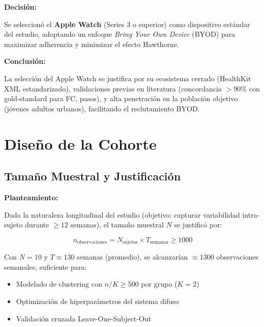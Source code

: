 \documentclass[12pt,letterpaper,twoside]{report}
\begin{document}
\begin{decisionbox}
\textbf{Decisión:}

Se seleccionó el \textbf{Apple Watch} (Series 3 o superior) como dispositivo estándar del estudio, adoptando un enfoque \textit{Bring Your Own Device} (BYOD) para maximizar adherencia y minimizar el efecto Hawthorne.
\end{decisionbox}

\begin{conclusionbox}
\textbf{Conclusión:}

La selección del Apple Watch se justifica por su ecosistema cerrado (HealthKit XML estandarizado), validaciones previas en literatura (concordancia $> 90\%$ con gold-standard para FC, pasos), y alta penetración en la población objetivo (jóvenes adultos urbanos), facilitando el reclutamiento BYOD.
\end{conclusionbox}

\section{Diseño de la Cohorte}

\subsection{Tamaño Muestral y Justificación}

\begin{hipotesisbox}
\textbf{Planteamiento:}

Dada la naturaleza longitudinal del estudio (objetivo: capturar variabilidad intra-sujeto durante $\geq 12$ semanas), el tamaño muestral $N$ se justificó por:

\begin{equation}
n_{\text{observaciones}} = N_{\text{sujetos}} \times T_{\text{semanas}} \geq 1000
\end{equation}

Con $N=10$ y $T \approx 130$ semanas (promedio), se alcanzarían $\approx 1300$ observaciones semanales, suficiente para:
\begin{itemize}[noitemsep]
    \item Modelado de clustering con $n/K \geq 500$ por grupo ($K=2$)
    \item Optimización de hiperparámetros del sistema difuso
    \item Validación cruzada Leave-One-Subject-Out
\end{itemize}
\end{hipotesisbox}
\end{document}
